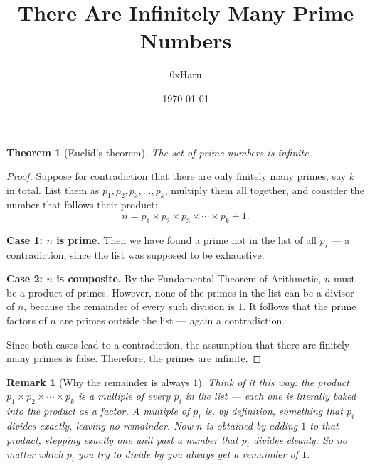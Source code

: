 \documentclass[12pt, a4paper]{article}
\title{\textbf{There Are Infinitely Many Prime Numbers}}
\author{0xHaru}
\date{\today}
\newtheorem{theorem}{Theorem}
\newtheorem{remark}{Remark}
\begin{document}
\maketitle

\begin{theorem}[Euclid's theorem]
The set of prime numbers is infinite.
\end{theorem}

\begin{proof}
Suppose for contradiction that there are only finitely many primes, say $k$ in
total. List them as $p_1, p_2, p_3, \ldots, p_k$, multiply them all together,
and consider the number that follows their product:
\[
    n = p_1 \times p_2 \times p_3 \times \cdots \times p_k + 1.
\]

\textbf{Case 1: $n$ is prime.} Then we have found a prime not in the list of all
$p_i$ --- a contradiction, since the list was supposed to be exhaustive.

\medskip

\textbf{Case 2: $n$ is composite.} By the Fundamental Theorem of Arithmetic,
$n$ must be a product of primes. However, none of the primes in the list can be
a divisor of $n$, because the remainder of every such division is $1$. It
follows that the prime factors of $n$ are primes outside the list --- again a
contradiction.

\medskip

Since both cases lead to a contradiction, the assumption that there are finitely
many primes is false. Therefore, the primes are infinite.
\end{proof}

\begin{remark}[Why the remainder is always $1$]
Think of it this way: the product $p_1 \times p_2 \times \cdots \times p_k$ is
a multiple of every $p_i$ in the list --- each one is literally baked into the
product as a factor. A multiple of $p_i$ is, by definition, something that
$p_i$ divides exactly, leaving no remainder. Now $n$ is obtained by adding $1$ to that product, stepping exactly one unit
past a number that $p_i$ divides cleanly. So no matter which $p_i$ you try
to divide by you always get a remainder of $1$.
\end{remark}
\end{document}

